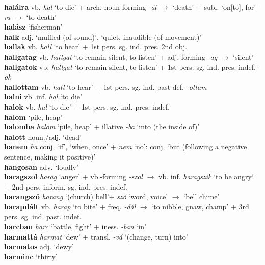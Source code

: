 \documentclass[11pt]{article}
\begin{document}
\textbf{halálra} vb. \emph{hal} `to die' + arch. noun\hyp{}forming
  \emph{-ál} $\rightarrow$ `death' + subl. `on[to], for' \emph{-ra}
  $\rightarrow$ `to death' \\
\textbf{halász} `fisherman'\\
\textbf{halk} adj. `muffled (of sound)', `quiet, inaudible (of
  movement)' \\
\textbf{hallak} vb. \emph{hall} `to hear' + 1st
pers. sg. ind. pres. 2nd obj. \\
\textbf{hallgatag} vb. \emph{hallgat} `to remain silent, to listen' +
adj.\hyp{}forming \emph{-ag} $\rightarrow$ `silent' \\
\textbf{hallgatok} vb. \emph{hallgat} `to remain silent, to listen' +
1st pers. sg. ind. pres. indef. \emph{-ok} \\
\textbf{hallottam} vb. \emph{hall} `to hear' + 1st pers. sg. ind. past
def. \emph{-ottam} \\
\textbf{halni} vb. inf. \emph{hal} `to die' \\
\textbf{halok} vb. \emph{hal} `to die' +  1st
pers. sg. ind. pres. indef. \\
\textbf{halom} `pile, heap' \\
\textbf{halomba} \emph{halom} `pile, heap' + illative \emph{-ba} `into (the inside of)' \\
\textbf{halott} noun./adj. `dead' \\
\textbf{hanem} \emph{ha} conj. `if', `when, once' + \emph{nem} `no':
conj. `but (following a negative sentence, making it positive)' \\
\textbf{hangosan} adv. `loudly' \\
\textbf{haragszol} \emph{harag} `anger' + vb.-forming \emph{-szol}
$\rightarrow$ vb. inf. \emph{haragszik} `to be angry` + 2nd
pers. inform. sg. ind. pres. indef. \\
\textbf{harangszó} \emph{harang} `(church) bell'+ \emph{szó} `word,
voice' $\rightarrow$ `bell chime' \\
\textbf{harapdált} vb. \emph{harap} `to bite' + freq. \emph{-dál}
$\rightarrow$ `to nibble, gnaw, champ' + 3rd pers. sg. ind. past. indef. \\
\textbf{harcban} \emph{harc} `battle, fight' + iness. \emph{-ban} `in' \\
\textbf{harmattá} \emph{harmat} `dew' + transl. \emph{-vá} `(change,
turn) into' \\
\textbf{harmatos} adj. `dewy' \\
\textbf{harminc} `thirty' \\
\end{document}
